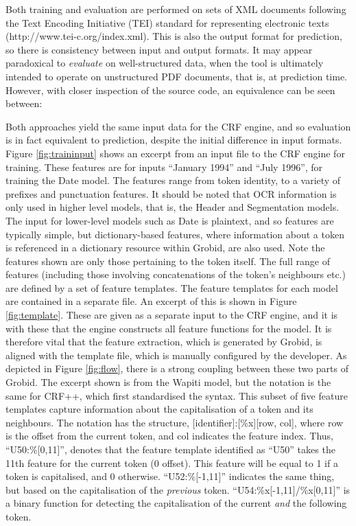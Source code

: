 Both training and evaluation are performed on sets of XML documents following the Text Encoding Initiative (TEI) standard for representing electronic texts (http://www.tei-c.org/index.xml). This is also the output format for prediction, so there is consistency between input and output formats. It may appear paradoxical to \emph{evaluate} on well-structured data, when the tool is ultimately intended to operate on unstructured PDF documents, that is, at prediction time. However, with closer inspection of the source code, an equivalence can be seen between:

Both approaches yield the same input data for the CRF engine, and so evaluation is in fact equivalent to prediction, despite the initial difference in input formats. Figure \ref{fig:traininput} shows an excerpt from an input file to the CRF engine for training. These features are for inputs ``January 1994'' and ``July 1996'', for training the Date model. The features range from token identity, to a variety of prefixes and punctuation features. It should be noted that OCR information is only used in higher level models, that is, the Header and Segmentation models. The input for lower-level models such as Date is plaintext, and so features are typically simple, but dictionary-based features, where information about a token is referenced in a dictionary resource within Grobid, are also used. Note the features shown are only those pertaining to the token itself. The full range of features (including those involving concatenations of the token's neighbours etc.) are defined by a set of feature templates. The feature templates for each model are contained in a separate file. An excerpt of this is shown in Figure \ref{fig:template}. These are given as a separate input to the CRF engine, and it is with these that the engine constructs all feature functions for the model. It is therefore vital that the feature extraction, which is generated by Grobid, is aligned with the template file, which is manually configured by the developer. As depicted in Figure \ref{fig:flow}, there is a strong coupling between these two parts of Grobid. The excerpt shown is from the Wapiti model, but the notation is the same for CRF++, which first standardised the syntax. This subset of five feature templates capture information about the capitalisation of a token and its neighbours. The notation has the structure, [identifier]:[\%x][row, col], where row is the offset from the current token, and col indicates the feature index. Thus, ``U50:\%[0,11]'', denotes that the feature template identified as ``U50'' takes the 11th feature for the current token (0 offset). This feature will be equal to 1 if a token is capitalised, and 0 otherwise. ``U52:\%[-1,11]'' indicates the same thing, but based on the capitalisation of the \emph{previous} token. ``U54:\%x[-1,11]/\%x[0,11]'' is a binary function for detecting the capitalisation of the current \emph{and} the following token.

